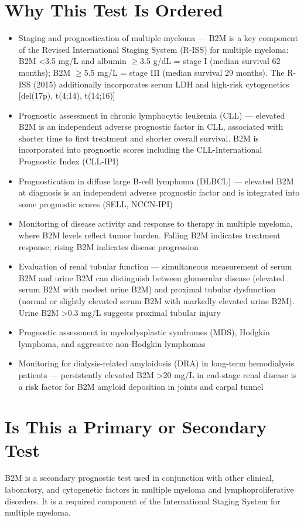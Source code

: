 \section*{Why This Test Is Ordered}
\begin{itemize}
  \item Staging and prognostication of multiple myeloma --- B2M is a key component of the Revised International Staging System (R-ISS) for multiple myeloma: B2M <3.5 mg/L and albumin $\geq$3.5 g/dL = stage I (median survival 62 months); B2M $\geq$5.5 mg/L = stage III (median survival 29 months). The R-ISS (2015) additionally incorporates serum LDH and high-risk cytogenetics [del(17p), t(4;14), t(14;16)]
  \item Prognostic assessment in chronic lymphocytic leukemia (CLL) --- elevated B2M is an independent adverse prognostic factor in CLL, associated with shorter time to first treatment and shorter overall survival. B2M is incorporated into prognostic scores including the CLL-International Prognostic Index (CLL-IPI)
  \item Prognostication in diffuse large B-cell lymphoma (DLBCL) --- elevated B2M at diagnosis is an independent adverse prognostic factor and is integrated into some prognostic scores (SELL, NCCN-IPI)
  \item Monitoring of disease activity and response to therapy in multiple myeloma, where B2M levels reflect tumor burden. Falling B2M indicates treatment response; rising B2M indicates disease progression
  \item Evaluation of renal tubular function --- simultaneous measurement of serum B2M and urine B2M can distinguish between glomerular disease (elevated serum B2M with modest urine B2M) and proximal tubular dysfunction (normal or slightly elevated serum B2M with markedly elevated urine B2M). Urine B2M >0.3 mg/L suggests proximal tubular injury
  \item Prognostic assessment in myelodysplastic syndromes (MDS), Hodgkin lymphoma, and aggressive non-Hodgkin lymphomas
  \item Monitoring for dialysis-related amyloidosis (DRA) in long-term hemodialysis patients --- persistently elevated B2M >20 mg/L in end-stage renal disease is a risk factor for B2M amyloid deposition in joints and carpal tunnel
\end{itemize}

\section*{Is This a Primary or Secondary Test}
B2M is a secondary prognostic test used in conjunction with other clinical, laboratory, and cytogenetic factors in multiple myeloma and lymphoproliferative disorders. It is a required component of the International Staging System for multiple myeloma.

